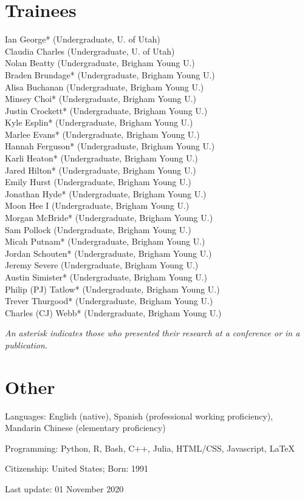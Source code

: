\documentclass[margin,line]{res}
\begin{document}
\begin{resume}
\section{\sc Trainees}
Ian George* (Undergraduate, U. of Utah) \\
Claudia Charles (Undergraduate, U. of Utah) \\
Nolan Beatty (Undergraduate, Brigham Young U.) \\
Braden Brundage* (Undergraduate, Brigham Young U.) \\
Alisa Buchanan (Undergraduate, Brigham Young U.) \\
Minsey Choi* (Undergraduate, Brigham Young U.) \\
Justin Crockett* (Undergraduate, Brigham Young U.) \\
Kyle Esplin* (Undergraduate, Brigham Young U.) \\
Marlee Evans* (Undergraduate, Brigham Young U.) \\
Hannah Ferguson* (Undergraduate, Brigham Young U.) \\
Karli Heaton* (Undergraduate, Brigham Young U.) \\
Jared Hilton* (Undergraduate, Brigham Young U.) \\
Emily Hurst (Undergraduate, Brigham Young U.) \\
Jonathan Hyde* (Undergraduate, Brigham Young U.) \\
Moon Hee I (Undergraduate, Brigham Young U.) \\
Morgan McBride* (Undergraduate, Brigham Young U.) \\
Sam Pollock (Undergraduate, Brigham Young U.) \\
Micah Putnam* (Undergraduate, Brigham Young U.) \\
Jordan Schouten* (Undergraduate, Brigham Young U.) \\
Jeremy Severe (Undergraduate, Brigham Young U.) \\
Austin Simister* (Undergraduate, Brigham Young U.) \\
Philip (PJ) Tatlow* (Undergraduate, Brigham Young U.) \\
Trever Thurgood* (Undergraduate, Brigham Young U.) \\
Charles (CJ) Webb* (Undergraduate, Brigham Young U.)

\textit{\small{An asterisk indicates those who presented their research at a conference or in a publication.}}


\section{\sc Other}
Languages: English (native), Spanish (professional working proficiency), Mandarin Chinese (elementary proficiency)

\vspace*{-2.5mm}
Programming:  Python, R, Bash, C++, Julia, HTML/CSS, Javascript, \LaTeX

\vspace*{-2.5mm}
Citizenship: United States; Born: 1991  \\

\begin{flushright}
Last update: 01 November 2020
\end{flushright}

\end{resume}
\end{document}
